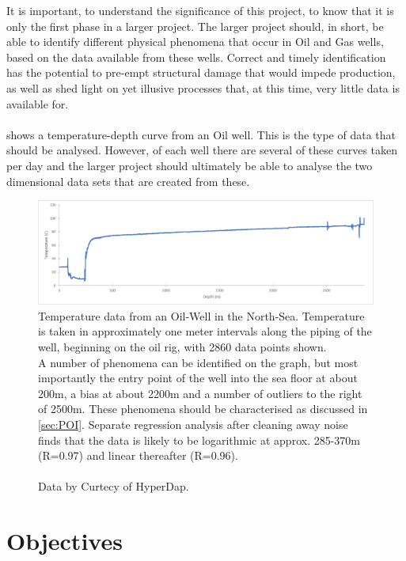 \documentclass[main.tex]{subfiles}
\begin{document}
    
  It is important, to understand the significance of this project, to know that it is only the first phase in a larger project. The larger project should, in short, be able to identify different physical phenomena that occur in Oil and Gas wells, based on the data available from these wells. Correct and timely identification has the potential to pre-empt structural damage that would impede production, as well as shed light on yet illusive processes that, at this time, very little data is available for.
  \\\\
   shows a temperature-depth curve from an Oil well. This is the type of data that should be analysed. However, of each well there are several of these curves taken per day and the larger project should ultimately be able to analyse the two dimensional data sets that are created from these. 
  
  \begin{figure}[h]
    \centering
    \includegraphics[width=\linewidth]{figures/wellData}
    \caption{Temperature data from an Oil-Well in the North-Sea. Temperature is taken in approximately one meter intervals along the piping of the well, beginning on the oil rig, with 2860 data points shown. \\
    A number of phenomena can be identified on the graph, but most importantly the entry point of the well into the sea floor at about 200m, a bias at about 2200m and a number of outliers to the right of 2500m. These phenomena should be characterised as discussed in \cref{sec:POI}. Separate regression analysis after cleaning away noise finds that the data is likely to be logarithmic at approx. 285-370m (R=0.97) and linear thereafter (R=0.96).
    \\\\
    Data by Curtecy of HyperDap.}
    \label{fig:well}
  \end{figure}
  
  \section{Objectives}
  
\end{document}
